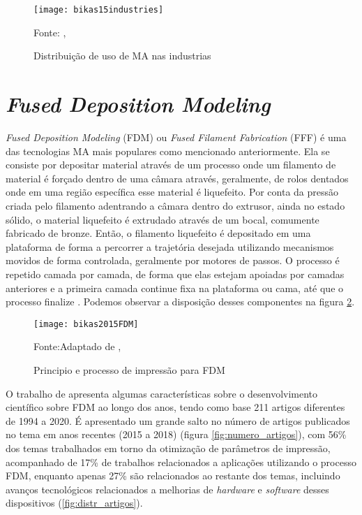 \begin{figure}[!htb]
    \begin{center}
    \caption{Distribuição de uso de MA nas industrias}
    \texttt{[image: bikas15industries]}

    {\footnotesize Fonte: \citeauthor{bikas16}, \citeyear{bikas16}}
    \label{fig:MA_industrias}
    \end{center}
\end{figure}

\section{\textit{Fused Deposition Modeling}}
\textit{Fused Deposition Modeling} (FDM) ou \textit{Fused Filament Fabrication} 
(FFF) é uma das tecnologias MA mais populares como mencionado anteriormente.
Ela se consiste por depositar material através de um processo 
onde um filamento de material é forçado dentro de uma câmara através,
geralmente, de rolos dentados onde em uma região específica esse 
material é liquefeito. Por conta da pressão criada pelo filamento 
adentrando a câmara dentro do extrusor, ainda no estado sólido, 
o material liquefeito é extrudado através de um bocal, 
comumente fabricado de bronze. Então, o filamento liquefeito é 
depositado em uma plataforma de forma a percorrer a trajetória 
desejada utilizando mecanismos movidos de forma controlada, 
geralmente por motores de passos. O processo é repetido camada 
por camada, de forma que elas estejam apoiadas por camadas 
anteriores e a primeira camada continue fixa na plataforma ou 
cama, até que o processo finalize \cite{turner14}.
Podemos observar a disposição desses componentes na figura \ref{fig:fdm_ex}.

\begin{figure}[!htb]
    \begin{center}
    \caption{Principio e processo de impressão para FDM}
    \texttt{[image: bikas2015FDM]}

    {\footnotesize Fonte:Adaptado de \citeauthor{bikas16}, \citeyear{bikas16}}
    \label{fig:fdm_ex}
    \end{center}
\end{figure}

O trabalho de \cite{vyavahare20} apresenta algumas 
características sobre o desenvolvimento científico sobre 
FDM ao longo dos anos, tendo como base 211 artigos diferentes 
de 1994 a 2020. É apresentado um grande salto no número de 
artigos publicados no tema em anos recentes (2015 a 2018) 
(figura \ref{fig:numero_artigos}), com 56\% dos temas trabalhados em torno da 
otimização de parâmetros de impressão, acompanhado de 17\% de 
trabalhos relacionados a aplicações utilizando o processo FDM, enquanto apenas 27\%
são relacionados ao restante dos temas, incluindo avanços tecnológicos relacionados
a melhorias de \textit{hardware} e \textit{software} desses dispositivos (\ref{fig:distr_artigos}).

